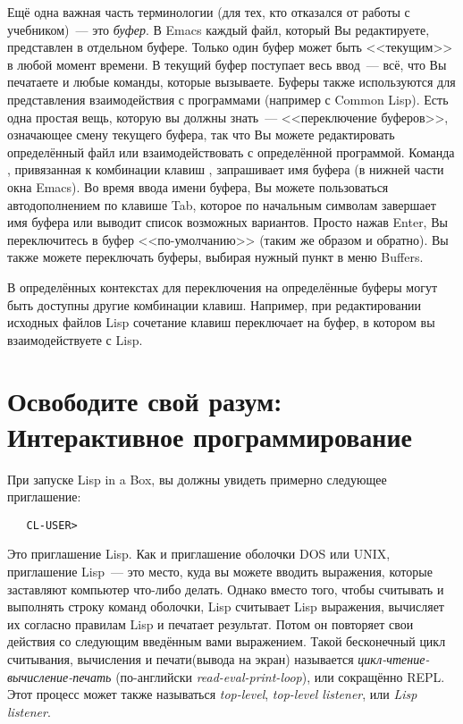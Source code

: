 Ещё одна важная часть терминологии (для тех, кто отказался от работы с учебником)~--- это
\emph{буфер}. В Emacs каждый файл, который Вы редактируете, представлен в
отдельном буфере. Только один буфер может быть <<текущим>> в любой момент времени. В текущий
буфер поступает весь ввод~--- всё, что Вы печатаете и любые команды, которые
вызываете. Буферы также используются для представления взаимодействия с программами
(например с Common Lisp). Есть одна простая вещь, которую вы должны знать~--- <<переключение
буферов>>, означающее смену текущего буфера, так что Вы можете редактировать определённый
файл или взаимодействовать с определённой программой. Команда ,
привязанная к комбинации клавиш , запрашивает имя буфера (в нижней части окна
Emacs). Во время ввода имени буфера, Вы можете пользоваться автодополнением по клавише
Tab, которое по начальным символам завершает имя буфера или выводит список возможных
вариантов. Просто нажав Enter, Вы переключитесь в буфер <<по-умолчанию>> (таким же образом и
обратно). Вы также можете переключать буферы, выбирая нужный пункт в меню Buffers.

В определённых контекстах для переключения на определённые буферы могут быть доступны
другие комбинации клавиш. Например, при редактировании исходных файлов Lisp сочетание
клавиш  переключает на буфер, в котором вы взаимодействуете с Lisp.

\section{Освободите свой разум: Интерактивное программирование}

При запуске Lisp in a Box, вы должны увидеть примерно следующее приглашение:

\begin{verbatim}
   CL-USER>
\end{verbatim}

Это приглашение Lisp. Как и приглашение оболочки DOS или UNIX, приглашение Lisp~--- это
место, куда вы можете вводить выражения, которые заставляют компьютер что-либо делать.
Однако вместо того, чтобы считывать и выполнять строку команд оболочки, Lisp
считывает Lisp выражения, вычисляет их согласно правилам Lisp и печатает результат. Потом
он повторяет свои действия со следующим введённым вами выражением. Такой бесконечный цикл
считывания, вычисления и печати(вывода на экран) называется
\emph{цикл-чтение-вычисление-печать} (по-английски \emph{read-eval-print-loop}), или
сокращённо REPL. Этот процесс может также называться \emph{top-level},
\emph{top-level listener}, или \emph{Lisp listener}.

